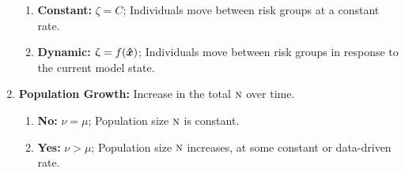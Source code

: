 \begin{fboxed}
\begin{enumerate}[leftmargin=1em]
\begin{enumerate}
      \item \textbf{Constant:} $\zeta = C$;
      Individuals move between risk groups at a constant rate.
      \item \textbf{Dynamic:} $\upzeta = f(\bm{\hat{x}})$;
      Individuals move between risk groups in response to the current model state.
    \end{enumerate}
    \item \label{ass:pop-growth}\textbf{Population Growth:}
    Increase in the total $\textsc{n}$ over time.
    \begin{enumerate}
      \item \textbf{No:} $\nu = \mu$;
      Population size $\textsc{n}$ is constant.
      \item \textbf{Yes:} $\nu > \mu$;
      Population size $\textsc{n}$ increases, at some constant or data-driven rate.
    \end{enumerate}
  \end{enumerate}
\end{fboxed}
